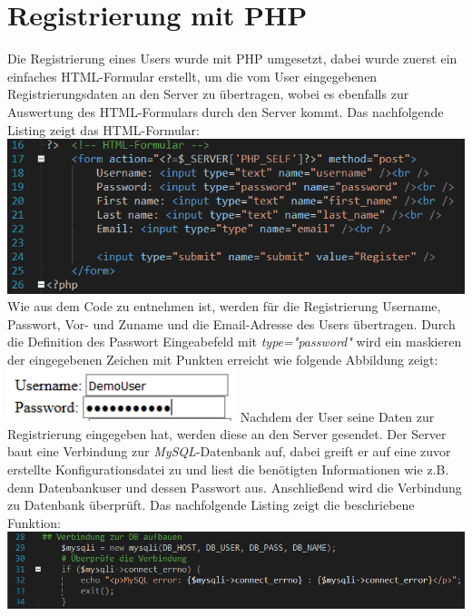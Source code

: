 \chapter{Registrierung mit PHP}
Die Registrierung eines Users wurde mit PHP umgesetzt, dabei wurde zuerst ein einfaches HTML-Formular erstellt, um die vom User eingegebenen Registrierungsdaten an den Server zu \"ubertragen, wobei es ebenfalls zur Auswertung des HTML-Formulars durch den Server kommt. 
Das nachfolgende Listing zeigt das HTML-Formular:
\newline
\includegraphics[width=1\textwidth]{img/vincent/abb11.png}
\newline
Wie aus dem Code zu entnehmen ist, werden f\"ur die Registrierung Username, Passwort, Vor- und Zuname und die Email-Adresse des Users \"ubertragen. Durch die Definition des Passwort Eingeabefeld mit \textit{type="password"} wird ein maskieren der eingegebenen Zeichen mit Punkten erreicht wie folgende Abbildung zeigt:
\newline
\includegraphics[width=0.5\textwidth]{img/vincent/abb01.png}
\newline
Nachdem der User seine Daten zur Registrierung eingegeben hat, werden diese an den Server gesendet. Der Server baut eine Verbindung zur \textit{MySQL}-Datenbank auf, dabei greift er auf eine zuvor erstellte Konfigurationsdatei zu und liest die ben\"otigten Informationen wie z.B. denn Datenbankuser und dessen Passwort aus. Anschlie{\ss}end wird die Verbindung zu Datenbank \"uberpr\"uft. Das nachfolgende Listing zeigt die beschriebene Funktion:
\newline
\includegraphics[width=1\textwidth]{img/vincent/abb12.png}
\newline

